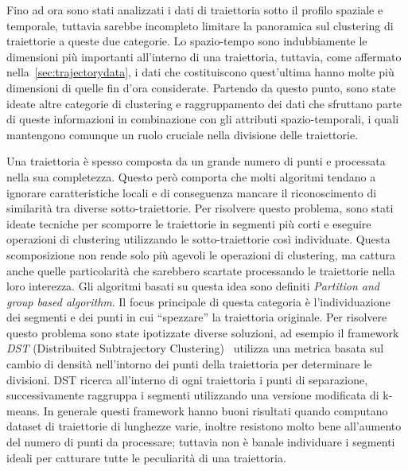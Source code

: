 
Fino ad ora sono stati analizzati i dati di traiettoria sotto il profilo
spaziale e temporale, tuttavia sarebbe incompleto limitare la panoramica sul clustering di traiettorie
a queste due categorie.
Lo spazio-tempo sono indubbiamente le dimensioni più importanti all'interno di una traiettoria,
tuttavia, come affermato nella~\cref{sec:trajectorydata},
i dati che costituiscono quest'ultima hanno molte più dimensioni di quelle fin d'ora considerate.
Partendo da questo punto, sono state ideate altre categorie di clustering e raggruppamento dei dati
che sfruttano parte di queste informazioni in combinazione con gli attributi spazio-temporali,
i quali mantengono comunque un ruolo cruciale nella divisione delle traiettorie.

Una traiettoria è spesso composta da un grande numero di punti e processata nella sua completezza.
Questo però comporta che molti algoritmi tendano a ignorare caratteristiche locali
e di conseguenza mancare il riconoscimento di similarità tra diverse sotto-traiettorie.
Per risolvere questo problema, sono stati ideate tecniche per scomporre le traiettorie in segmenti più corti
e eseguire operazioni di clustering utilizzando le sotto-traiettorie così individuate.
Questa scomposizione non rende solo più agevoli le operazioni di clustering, ma cattura anche
quelle particolarità che sarebbero scartate processando le traiettorie nella loro interezza.
Gli algoritmi basati su questa idea sono definiti \textit{Partition and group based algorithm}.
Il focus principale di questa categoria è l'individuazione dei segmenti e
dei punti in cui ``spezzare'' la traiettoria originale.
Per risolvere questo problema sono state ipotizzate diverse soluzioni,
ad esempio il framework \textit{DST} (Distribuited Subtrajectory Clustering)~\cite{tampakis2019scalable} utilizza una metrica basata
sul cambio di densità nell'intorno dei punti della traiettoria per determinare le divisioni.
DST ricerca all'interno di ogni traiettoria i punti di separazione, successivamente raggruppa i segmenti 
utilizzando una versione modificata di k-means.
In generale questi framework hanno buoni risultati quando computano dataset di traiettorie
di lunghezze varie, inoltre resistono molto bene all'aumento del numero di punti da processare;
tuttavia non è banale individuare i segmenti ideali per catturare tutte le peculiarità
di una traiettoria.

